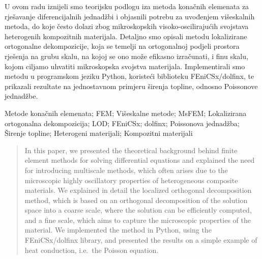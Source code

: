 \documentclass[zavrsnirad]{fer}
\begin{document}






\begin{sazetak}
  U ovom radu iznijeli smo teorijsku podlogu iza metoda konačnih elemenata za rješavanje diferencijalnih jednadžbi
  i objasnili potrebu za uvođenjem višeskalnih metoda, do koje često dolazi zbog mikroskopskih visoko-oscilirajućih svojstava
  heterogenih kompozitnih materijala. Detaljno smo opisali metodu lokalizirane ortogonalne dekompozicije,
  koja se temelji na ortogonalnoj podjeli prostora rješenja na grubu skalu, na kojoj se ono može efikasno izračunati,
  i finu skalu, kojom ciljamo uhvatiti mikroskopska svojstva materijala. Implementirali smo metodu u programskom jeziku Python,
  koristeći biblioteku FEniCSx/dolfinx, te prikazali rezultate na jednostavnom primjeru širenja topline, odnosno Poissonove jednadžbe.
\end{sazetak}

\begin{kljucnerijeci}
  \frenchspacing
  Metode konačnih elemenata; FEM; Višeskalne metode; MsFEM; Lokalizirana ortogonalna dekompozicija; LOD;
  FEniCSx; dolfinx; Poissonova jednadžba; Širenje topline; Heterogeni materijali; Kompozitni materijali
  \nonfrenchspacing
\end{kljucnerijeci}


\begin{abstract}
  In this paper, we presented the theoretical background behind finite element methods for solving differential equations
  and explained the need for introducing multiscale methods, which often arises due to the microscopic highly oscillatory properties
  of heterogeneous composite materials. We explained in detail the localized orthogonal decomposition method,
  which is based on an orthogonal decomposition of the solution space into a coarse scale, where the solution can be efficiently computed,
  and a fine scale, which aims to capture the microscopic properties of the material. We implemented the method in Python,
  using the FEniCSx/dolfinx library, and presented the results on a simple example of heat conduction, i.e.\ the Poisson equation.
\end{abstract}
\end{document}
